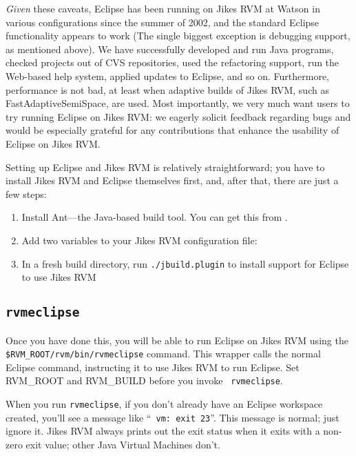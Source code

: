 {\it Given} these caveats, Eclipse has been running on Jikes RVM at
Watson in various configurations since the summer of 2002, and the
standard Eclipse functionality appears to work (The single biggest
exception is debugging support, as mentioned above).  We have
successfully developed and run Java programs, checked projects out of
CVS repositories, used the refactoring support, run the Web-based help
system, applied updates to Eclipse, and so on.  Furthermore,
performance is not bad, at least when adaptive builds of Jikes RVM,
such as FastAdaptiveSemiSpace, are used.  Most importantly, we very
much want users to try running Eclipse on Jikes RVM: we eagerly
solicit feedback regarding bugs and would be especially grateful for
any contributions that enhance the usability of Eclipse on Jikes RVM.

Setting up Eclipse and Jikes RVM is relatively straightforward; you
have to install Jikes RVM and Eclipse themselves first, and, after
that, there are just a few steps:
\begin{enumerate}
\item Install Ant---the Java-based build tool.  You can get this from
\xlink{{\tt \antURL}}{\antURL}. 
\item Add two variables to your Jikes RVM configuration file:
\item In a fresh build directory, run {\tt ./jbuild.plugin} to install
support for Eclipse to use Jikes RVM
\end{enumerate}

\subsection{{\tt rvmeclipse}}

Once you have done this, you will be able to run Eclipse on Jikes RVM
using the {\tt \$RVM\_ROOT/rvm/bin/rvmeclipse} command.  This wrapper
calls the normal Eclipse command, instructing it to use Jikes RVM to
run Eclipse.  Set RVM\_ROOT and RVM\_BUILD before you invoke {\tt
rvmeclipse}.

When you run {\tt rvmeclipse}, if you don't already
have an Eclipse workspace created, you'll see a message like ``{\tt
vm: exit 23}''.  This message is normal; just ignore it.  Jikes RVM
always prints out the exit status when it exits with a non-zero
exit value; other Java Virtual Machines don't.

